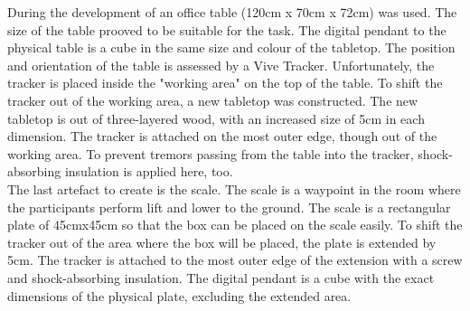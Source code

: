 During the development of \exgo an office table (120cm x 70cm x 72cm) was used. The size of the table prooved to be suitable for the task. The digital pendant to the physical table is a cube in the same size and colour of the tabletop. The position and orientation of the table is assessed by a Vive Tracker. Unfortunately, the tracker is placed inside the "working area" on the top of the table. To shift the tracker out of the working area, a new tabletop was constructed. The new tabletop is out of three-layered wood, with an increased size of 5cm in each dimension. The tracker is attached on the most outer edge, though out of the working area. To prevent tremors passing from the table into the tracker, shock-absorbing insulation is applied here, too.\\
The last artefact to create is the scale. The scale is a waypoint in the room where the participants perform lift and lower to the ground. The scale is a rectangular plate of 45cmx45cm so that the box can be placed on the scale easily. To shift the tracker out of the area where the box will be placed, the plate is extended by 5cm. The tracker is attached to the most outer edge of the extension with a screw and shock-absorbing insulation. The digital pendant is a cube with the exact dimensions of the physical plate, excluding the extended area.\\

